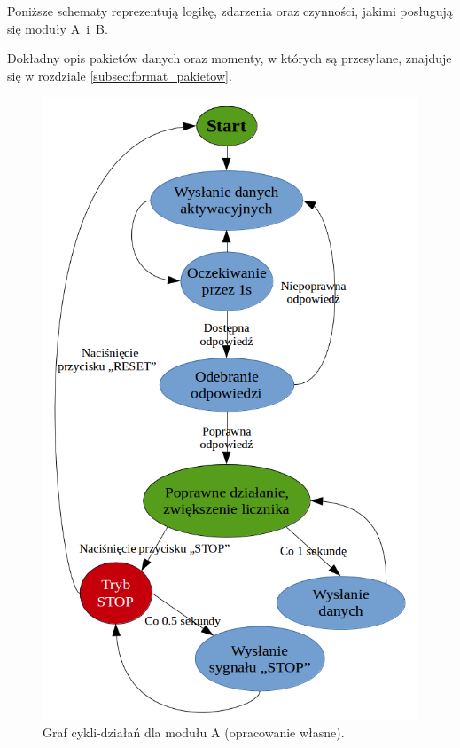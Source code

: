 Poniższe schematy reprezentują logikę, zdarzenia oraz czynności, jakimi posługują się moduły A~i~B.

Dokładny opis pakietów danych oraz momenty, w których są przesyłane, znajduje się w rozdziale \ref{subsec:format_pakietow}.

\raggedbottom

\begin{figure}[H]
	\centering
	\includegraphics[scale=0.8]{schemas/cycle_action_A.png}
	\caption{\label{fig:cycle_action_A}Graf cykli-działań dla modułu A (opracowanie własne).}
\end{figure}

